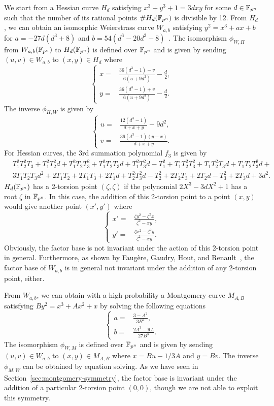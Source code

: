 We start from a Hessian curve $H_d$ satisfying $x^3 + y^3 + 1 = 3dxy$
for some $d\in\mathbb F_{p^n}$ such that the number of its rational points
$\#H_d(\mathbb F_{p^n})$ is divisible by 12.
%
From $H_d$, we can obtain an isomorphic Weierstrass curve $W_{a,b}$
satisfying $y^2 = x^3 + ax + b$ for $a = - 27d(d^3 + 8)$ and
$b = 54(d^6 - 20d^3 - 8)$~\cite{DBLP:conf/ches/Smart01}.
%
The isomorphism $\phi_{W,H}$ from $W_{a,b}(\mathbb F_{p^n})$ to $H_d(\mathbb F_{p^n})$
is defined over $\mathbb F_{p^n}$ and is given by sending $(u,v)\in W_{a,b}$
to $(x,y)\in H_d$ where
\[ \left\{\begin{aligned}
x = & \frac{36(d^3 - 1) - v}{6(u + 9d^2)} - \frac{d}{2}, \\
y = & \frac{36(d^3 - 1) + v}{6(u + 9d^2)} - \frac{d}{2}.
\end{aligned}\right. \]
%
The inverse $\phi_{H,W}$ is given by
\[ \left\{\begin{aligned}
u = & \frac{12(d^3 - 1)}{d + x + y} - 9d^2, \\
v = & \frac{36(d^3 - 1)(y - x)}{d + x + y}.
\end{aligned}\right. \]
%
For Hessian curves, the 3rd summation polynomial $f_3$ is given by
\[ \begin{aligned} & T_1^2T_2^2T_3 + T_1^2T_2^2d + T_1^2T_2T_3^2 +
    T_1^2T_2T_3d + T_1^2T_3^2d - T_1^2 + T_1T_2^2T_3^2 + T_1T_2^2T_3d
    + T_1T_2T_3^2d + \\
    & 3T_1T_2T_3d^2 + 2T_1T_2 + 2T_1T_3 + 2T_1d + T_2^2T_3^2d - T_2^2
    + 2T_2T_3 + 2T_2d - T_3^2 + 2T_3d + 3d^2.
 \end{aligned} \]
%
$H_d(\mathbb F_{p^n})$ has a 2-torsion point $(\zeta,\zeta)$ if the polynomial
$2X^3 - 3dX^2 + 1$ has a root $\zeta$ in $\mathbb F_{p^n}$.
%
In this case, the addition of this 2-torsion point to a point $(x,y)$
would give another point $(x',y')$ where
\[ \left\{\begin{aligned}
x' = & \frac{\zeta y^2 - \zeta^2x}{\zeta^2 - xy}, \\
y' = & \frac{\zeta x^2 - \zeta^2y}{\zeta^2 - xy}.
\end{aligned}\right. \]
%
Obviously, the factor base is not invariant under the action of this
2-torsion point in general.
%
Furthermore, as shown by Faug\`ere, Gaudry, Hout, and
Renault~\cite{DBLP:conf/eurocrypt/FaugereHJRV14}, the factor base of
$W_{a,b}$ is in general not invariant under the addition of any
2-torsion point, either.


From $W_{a,b}$, we can obtain with a high probability a Montgomery
curve $M_{A,B}$ satisfying $By^2 = x^3 + Ax^2 + x$ by solving the
following equations
%
\[ \left\{\begin{aligned}
a = & \frac{3 - A^2}{3B^2}, \\
b = & \frac{2A^3 - 9A}{27B^3}.
\end{aligned}\right. \]
%
The isomorphism $\phi_{W,M}$ is defined over
$\mathbb F_{p^n}$ and is given by sending $(u,v)\in W_{a,b}$ to
$(x,y)\in M_{A,B}$ where $x = Bu - 1/3A$ and $y = Bv$.
%
The inverse $\phi_{M,W}$ can be obtained by equation solving.
%
As we have seen in Section~\ref{sec:montgomery-symmetry}, the factor
base is invariant under the addition of a particular 2-torsion point
$(0,0)$, though we are not able to exploit this symmetry.

